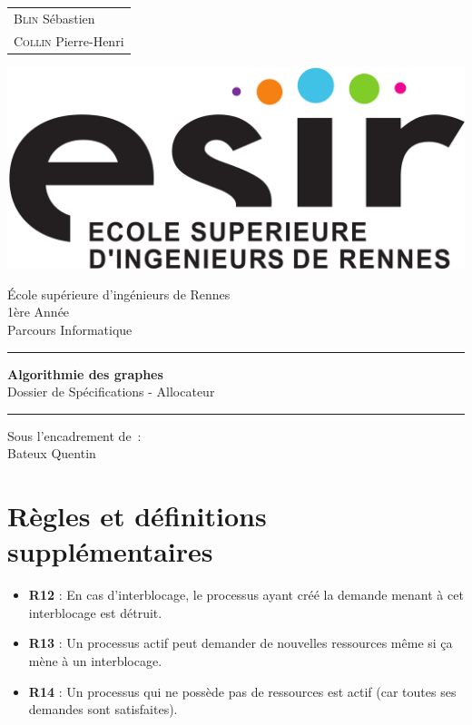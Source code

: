 \documentclass{article}
\newcommand{\bitem}{\item[\textbullet]}
\begin{document}
\begin{titlepage}
	\vspace{-20px}
	\begin{tabular}{l}
		\textsc{Blin} S\'ebastien\\
		\textsc{Collin} Pierre-Henri
	\end{tabular}
	\hfill \vspace{10px}\includegraphics[scale=0.1]{esir.png}\\
	\vfill
	\begin{center}
		\Huge{\'Ecole sup\'erieure d'ing\'enieurs de Rennes}\\
		\vspace{1cm}
		\LARGE{1\`ere Ann\'ee}\\
		\large{Parcours Informatique}\\
		\vspace{0.5cm}\hrule\vspace{0.5cm}
		\LARGE{\textbf{Algorithmie des graphes}}\\
		\Large{Dossier de Spécifications - Allocateur}
		\vspace{0.5cm}\hrule
		\vfill
		\vfill
	\end{center}
	\begin{flushleft}
		\Large{Sous l'encadrement de~:}\\
		\vspace{0.2cm}
		\large{{Bateux} Quentin}
	\end{flushleft}
	\vfill
\end{titlepage}

\section{Règles et définitions supplémentaires}
\begin{itemize}
  \bitem \textbf{R12} : En cas d'interblocage, le processus ayant créé la demande menant à cet interblocage est détruit.
  \bitem \textbf{R13} : Un processus actif peut demander de nouvelles ressources même si ça mène à un interblocage.
  \bitem \textbf{R14} : Un processus qui ne possède pas de ressources est actif (car toutes ses demandes sont satisfaites).
\end{itemize}
\end{document}
